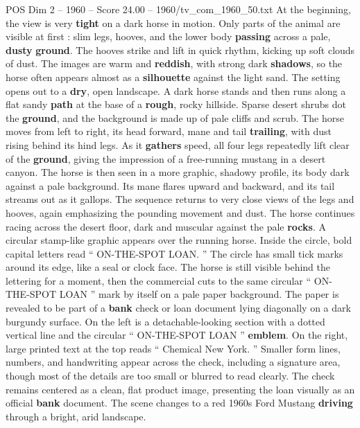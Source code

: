 \begin{textsample}{POS Dim 2 – 1960 – Score 24.00 – 1960/tv\_com\_1960\_50.txt}  \label{ex:f2_pos_005}
At the beginning, the view is very \textbf{tight} on a dark horse in motion.
Only parts of the animal are visible at first : slim legs, hooves, and the lower body \textbf{passing} across a pale, \textbf{dusty} \textbf{ground}.
The hooves strike and lift in quick rhythm, kicking up soft clouds of dust.
The images are warm and \textbf{reddish}, with strong dark \textbf{shadows}, so the horse often appears almost as a \textbf{silhouette} against the light sand.
The setting opens out to a \textbf{dry}, open landscape.
A dark horse stands and then runs along a flat sandy \textbf{path} at the base of a \textbf{rough}, rocky hillside.
Sparse desert shrubs dot the \textbf{ground}, and the background is made up of pale cliffs and scrub.
The horse moves from left to right, its head forward, mane and tail \textbf{trailing}, with dust rising behind its hind legs.
As it \textbf{gathers} speed, all four legs repeatedly lift clear of the \textbf{ground}, giving the impression of a free-running mustang in a desert canyon.
The horse is then seen in a more graphic, shadowy profile, its body dark against a pale background.
Its mane flares upward and backward, and its tail streams out as it gallops.
The sequence returns to very close views of the legs and hooves, again emphasizing the pounding movement and dust.
The horse continues racing across the desert floor, dark and muscular against the pale \textbf{rocks}.
A circular stamp-like graphic appears over the running horse.
Inside the circle, bold capital letters read “ ON-THE-SPOT LOAN. ” The circle has small tick marks around its edge, like a seal or clock face.
The horse is still visible behind the lettering for a moment, then the commercial cuts to the same circular “ ON-THE-SPOT LOAN ” mark by itself on a pale paper background.
The paper is revealed to be part of a \textbf{bank} check or loan document lying diagonally on a dark burgundy surface.
On the left is a detachable-looking section with a dotted vertical line and the circular “ ON-THE-SPOT LOAN ” \textbf{emblem}.
On the right, large printed text at the top reads “ Chemical New York. ” Smaller form lines, numbers, and handwriting appear across the check, including a signature area, though most of the details are too small or blurred to read clearly.
The check remains centered as a clean, flat product image, presenting the loan visually as an official \textbf{bank} document.
The scene changes to a red 1960s Ford Mustang \textbf{driving} through a bright, arid landscape.

\end{textsample}
